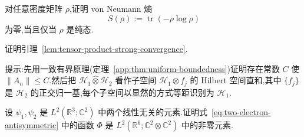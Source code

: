 \begin{exercise}\label{ex:von-neumann-entropy}
对任意密度矩阵 $\rho$,证明 von Neumann 熵
\[
\ S(\rho):=\operatorname{tr}(-\rho\log\rho)
\]
为零,当且仅当 $\rho$ 是纯态.
\end{exercise}

\begin{exercise}[张量积算子的强收敛]\label{ex:tensor-product-strong}
证明引理~\ref{lem:tensor-product-strong-convergence}.

提示:先用一致有界原理(定理~\ref{app:thm:uniform-boundedness})证明存在常数 $C$ 使 $\|A_n\|\le C$.然后把 $\mathcal H_1\widehat\otimes\mathcal H_2$ 看作子空间 $\mathcal H_1\otimes f_j$ 的 Hilbert 空间直和,其中 $\{f_j\}$ 是 $\mathcal H_2$ 的正交归一基,每个子空间以显然的方式等距识别为 $\mathcal H_1$.
\end{exercise}

\begin{exercise}[反对称双电子波函数非零]\label{ex:two-electron-antisymmetric-nonzero}
设 $\psi_1,\psi_2$ 是 $L^2(\mathbb R^3;\mathbb C^2)$ 中两个线性无关的元素.证明式~\eqref{eq:two-electron-antisymmetric} 中的函数 $\Phi$ 是 $L^2(\mathbb R^6;\mathbb C^2\otimes\mathbb C^2)$ 中的非零元素.
\end{exercise}
